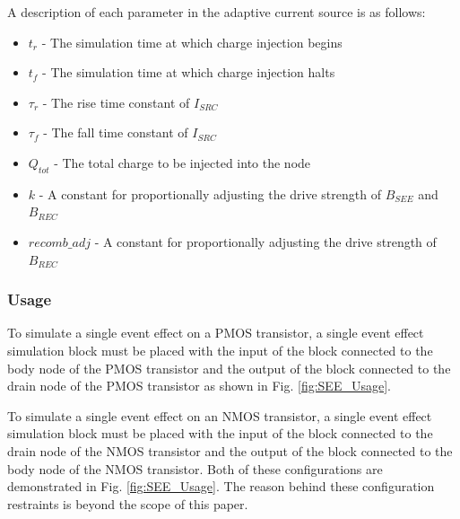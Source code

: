 \documentclass[conference]{IEEEtran}
\begin{document}
    A description of each parameter in the adaptive current source is as follows:

    \begin{itemize}

        \item[] \(t_r\) - The simulation time at which charge injection begins

        \item[] \(t_f\) - The simulation time at which charge injection halts

        \item[] \(\tau_r\) - The rise time constant of \(I_{SRC}\)

        \item[] \(\tau_f\) - The fall time constant of \(I_{SRC}\)

        \item[] \(Q_{tot}\) - The total charge to be injected into the node

        \item[] \(k\) - A constant for proportionally adjusting the drive strength of \(B_{SEE}\) and \(B_{REC}\)

        \item[] \(recomb\_adj\) - A constant for proportionally adjusting the drive strength of \(B_{REC}\)

    \end{itemize}
    \vspace{1em}

    \subsubsection{Usage}
    To simulate a single event effect on a PMOS transistor, a single event effect simulation block must be placed with the input of the block connected to the body node of the PMOS transistor and the output of the block connected to the drain node of the PMOS transistor as shown in Fig. \ref{fig:SEE_Usage}.

    To simulate a single event effect on an NMOS transistor, a single event effect simulation block must be placed with the input of the block connected to the drain node of the NMOS transistor and the output of the block connected to the body node of the NMOS transistor.
    Both of these configurations are demonstrated in Fig. \ref{fig:SEE_Usage}.
    The reason behind these configuration restraints is beyond the scope of this paper.
\end{document}

